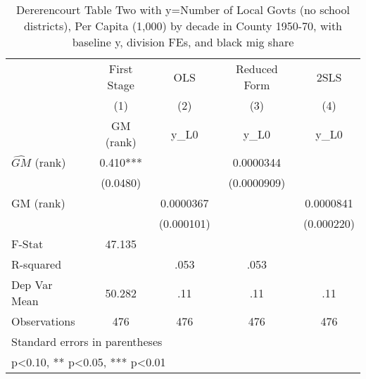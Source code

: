 \begin{table}[htbp]\centering
\def\sym#1{\ifmmode^{#1}\else\(^{#1}\)\fi}
\caption{Dererencourt Table Two with y=Number of Local Govts (no school districts), Per Capita (1,000) by decade in County 1950-70, with baseline y, division FEs, and black mig share}
\begin{tabular}{l*{4}{c}}
\toprule
                    & First Stage   &         OLS   &Reduced Form   &        2SLS   \\
                    &\multicolumn{1}{c}{(1)}&\multicolumn{1}{c}{(2)}&\multicolumn{1}{c}{(3)}&\multicolumn{1}{c}{(4)}\\
                    &\multicolumn{1}{c}{GM  (rank)}&\multicolumn{1}{c}{y\_L0}&\multicolumn{1}{c}{y\_L0}&\multicolumn{1}{c}{y\_L0}\\
\midrule
$\hat{GM}$ (rank)   &       0.410***&               &   0.0000344   &               \\
                    &    (0.0480)   &               & (0.0000909)   &               \\
\addlinespace
GM  (rank)          &               &   0.0000367   &               &   0.0000841   \\
                    &               &  (0.000101)   &               &  (0.000220)   \\
\midrule
F-Stat              &      47.135   &               &               &               \\
R-squared           &               &        .053   &        .053   &               \\
Dep Var Mean        &      50.282   &         .11   &         .11   &         .11   \\
Observations        &         476   &         476   &         476   &         476   \\
\bottomrule
\multicolumn{5}{l}{\footnotesize Standard errors in parentheses}\\
\multicolumn{5}{l}{\footnotesize * p<0.10, ** p<0.05, *** p<0.01}\\
\end{tabular}
\end{table}
